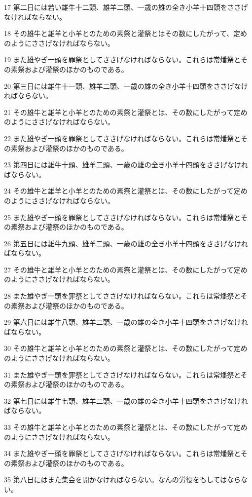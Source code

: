 \par 17 第二日には若い雄牛十二頭、雄羊二頭、一歳の雄の全き小羊十四頭をささげなければならない。
\par 18 その雄牛と雄羊と小羊とのための素祭と灌祭とはその数にしたがって、定めのようにささげなければならない。
\par 19 また雄やぎ一頭を罪祭としてささげなければならない。これらは常燔祭とその素祭および灌祭のほかのものである。
\par 20 第三日には雄牛十一頭、雄羊二頭、一歳の雄の全き小羊十四頭をささげなければならない。
\par 21 その雄牛と雄羊と小羊とのための素祭と灌祭とは、その数にしたがって定めのようにささげなければならない。
\par 22 また雄やぎ一頭を罪祭としてささげなければならない。これらは常燔祭とその素祭および灌祭のほかのものである。
\par 23 第四日には雄牛十頭、雄羊二頭、一歳の雄の全き小羊十四頭をささげなければならない。
\par 24 その雄牛と雄羊と小羊とのための素祭と灌祭とは、その数にしたがって定めのようにささげなければならない。
\par 25 また雄やぎ一頭を罪祭としてささげなければならない。これらは常燔祭とその素祭および灌祭のほかのものである。
\par 26 第五日には雄牛九頭、雄羊二頭、一歳の雄の全き小羊十四頭をささげなければならない。
\par 27 その雄牛と雄羊と小羊とのための素祭と灌祭とは、その数にしたがって定めのようにささげなければならない。
\par 28 また雄やぎ一頭を罪祭としてささげなければならない。これらは常燔祭とその素祭および灌祭のほかのものである。
\par 29 第六日には雄牛八頭、雄羊二頭、一歳の雄の全き小羊十四頭をささげなければならない。
\par 30 その雄牛と雄羊と小羊とのための素祭と灌祭とは、その数にしたがって定めのようにささげなければならない。
\par 31 また雄やぎ一頭を罪祭としてささげなければならない。これらは常燔祭とその素祭および灌祭のほかのものである。
\par 32 第七日には雄牛七頭、雄羊二頭、一歳の雄の全き小羊十四頭をささげなければならない。
\par 33 その雄牛と雄羊と小羊とのための素祭と灌祭とは、その数にしたがって定めのようにささげなければならない。
\par 34 また雄やぎ一頭を罪祭としてささげなければならない。これらは常燔祭とその素祭および灌祭のほかのものである。
\par 35 第八日にはまた集会を開かなければならない。なんの労役をもしてはならない。

